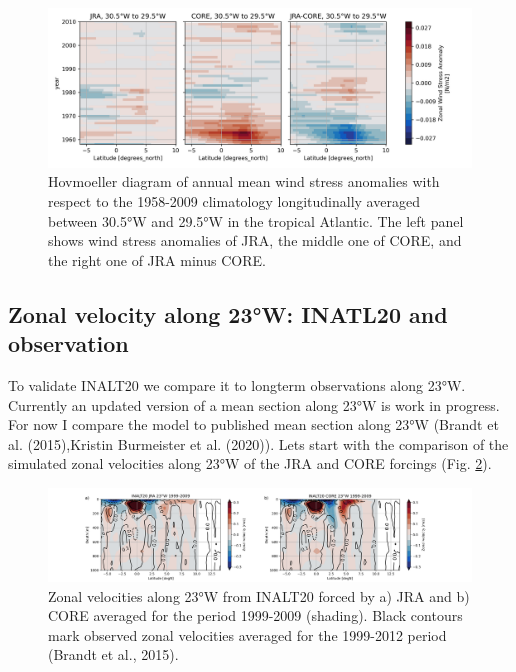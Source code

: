 \documentclass[a4paperpaper,]{article}
\begin{document}
\begin{figure}
\centering
\includegraphics{./figures/INALT20_wind_forcing_comparison/INALT_JRA_CORE_taux_anomaly_hovm_merid_6s6n_30p5w29p5w.png}
\caption{Hovmoeller diagram of annual mean wind stress anomalies with
respect to the 1958-2009 climatology longitudinally averaged between
30.5°W and 29.5°W in the tropical Atlantic. The left panel shows wind
stress anomalies of JRA, the middle one of CORE, and the right one of
JRA minus CORE. \label{fig_JRA_CORE_taux_30w}}
\end{figure}

\subsection{Zonal velocity along 23°W: INATL20 and
observation}\label{zonal-velocity-along-23w-inatl20-and-observation}

To validate INALT20 we compare it to longterm observations along 23°W.
Currently an updated version of a mean section along 23°W is work in
progress. For now I compare the model to published mean section along
23°W (Brandt et al. (2015),Kristin Burmeister et al. (2020)). Lets start
with the comparison of the simulated zonal velocities along 23°W of the
JRA and CORE forcings (Fig. \ref{fig_JRA_CORE_ucur_23w}).

\begin{figure}
\centering
\includegraphics[width=1.50000\textwidth]{./figures/INALT20_obs_23w_comparison/1_INALT20_CORE_JRA_obs_23w_1999_2009.png}
\caption{Zonal velocities along 23°W from INALT20 forced by a) JRA and
b) CORE averaged for the period 1999-2009 (shading). Black contours mark
observed zonal velocities averaged for the 1999-2012 period (Brandt et
al., 2015). \label{fig_JRA_CORE_ucur_23w}}
\end{figure}
\end{document}
